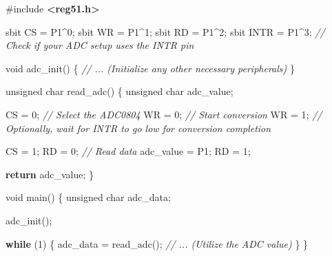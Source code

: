 \documentclass[
]{article}
\newenvironment{Shaded}{}{}
\newcommand{\CommentTok}[1]{\textcolor[rgb]{0.38,0.63,0.69}{\textit{#1}}}
\newcommand{\ControlFlowTok}[1]{\textcolor[rgb]{0.00,0.44,0.13}{\textbf{#1}}}
\newcommand{\DataTypeTok}[1]{\textcolor[rgb]{0.56,0.13,0.00}{#1}}
\newcommand{\DecValTok}[1]{\textcolor[rgb]{0.25,0.63,0.44}{#1}}
\newcommand{\ImportTok}[1]{\textcolor[rgb]{0.00,0.50,0.00}{\textbf{#1}}}
\newcommand{\NormalTok}[1]{#1}
\newcommand{\OperatorTok}[1]{\textcolor[rgb]{0.40,0.40,0.40}{#1}}
\newcommand{\PreprocessorTok}[1]{\textcolor[rgb]{0.74,0.48,0.00}{#1}}
\begin{document}
\begin{Shaded}
\begin{Highlighting}[]
\PreprocessorTok{\#include }\ImportTok{\textless{}reg51.h\textgreater{}}

\NormalTok{sbit CS   }\OperatorTok{=}\NormalTok{ P1}\OperatorTok{\^{}}\DecValTok{0}\OperatorTok{;}
\NormalTok{sbit WR   }\OperatorTok{=}\NormalTok{ P1}\OperatorTok{\^{}}\DecValTok{1}\OperatorTok{;}
\NormalTok{sbit RD   }\OperatorTok{=}\NormalTok{ P1}\OperatorTok{\^{}}\DecValTok{2}\OperatorTok{;}
\NormalTok{sbit INTR }\OperatorTok{=}\NormalTok{ P1}\OperatorTok{\^{}}\DecValTok{3}\OperatorTok{;} \CommentTok{// Check if your ADC setup uses the INTR pin}

\DataTypeTok{void}\NormalTok{ adc\_init}\OperatorTok{()} \OperatorTok{\{}
    \CommentTok{// ... (Initialize any other necessary peripherals)}
\OperatorTok{\}}

\DataTypeTok{unsigned} \DataTypeTok{char}\NormalTok{ read\_adc}\OperatorTok{()} \OperatorTok{\{}
    \DataTypeTok{unsigned} \DataTypeTok{char}\NormalTok{ adc\_value}\OperatorTok{;}

\NormalTok{    CS }\OperatorTok{=} \DecValTok{0}\OperatorTok{;}      \CommentTok{// Select the ADC0804}
\NormalTok{    WR }\OperatorTok{=} \DecValTok{0}\OperatorTok{;}      \CommentTok{// Start conversion}
\NormalTok{    WR }\OperatorTok{=} \DecValTok{1}\OperatorTok{;}
    \CommentTok{// Optionally, wait for INTR to go low for conversion completion}

\NormalTok{    CS }\OperatorTok{=} \DecValTok{1}\OperatorTok{;}
\NormalTok{    RD }\OperatorTok{=} \DecValTok{0}\OperatorTok{;}      \CommentTok{// Read data}
\NormalTok{    adc\_value }\OperatorTok{=}\NormalTok{ P1}\OperatorTok{;}
\NormalTok{    RD }\OperatorTok{=} \DecValTok{1}\OperatorTok{;}

    \ControlFlowTok{return}\NormalTok{ adc\_value}\OperatorTok{;}
\OperatorTok{\}}

\DataTypeTok{void}\NormalTok{ main}\OperatorTok{()} \OperatorTok{\{}
    \DataTypeTok{unsigned} \DataTypeTok{char}\NormalTok{ adc\_data}\OperatorTok{;}

\NormalTok{    adc\_init}\OperatorTok{();}

    \ControlFlowTok{while} \OperatorTok{(}\DecValTok{1}\OperatorTok{)} \OperatorTok{\{}
\NormalTok{        adc\_data }\OperatorTok{=}\NormalTok{ read\_adc}\OperatorTok{();}
        \CommentTok{// ... (Utilize the ADC value)}
    \OperatorTok{\}}
\OperatorTok{\}}
\end{Highlighting}
\end{Shaded}
\end{document}
